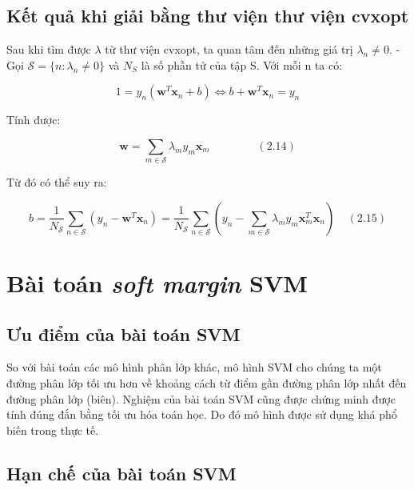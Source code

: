 \documentclass[a4paper, 12pt, oneside]{report}
\begin{document}
\subsection{Kết quả khi giải bằng thư viện thư viện cvxopt}
Sau khi tìm được $\lambda$ từ thư viện cvxopt, ta quan tâm đến những giá trị $\lambda_n \neq 0$. 
- Gọi $\mathcal{S} = \{n: \lambda_n \neq 0\}$ và $N_S$ là số phần tử của tập S. Với mỗi n ta có:
\begin{mybox}
$$1 = y_n(\mathbf{w}^T\mathbf{x}_n + b) \Leftrightarrow b + \mathbf{w}^T\mathbf{x}_n = y_n$$ \end{mybox}
Tính được: \begin{mybox} $$\mathbf{w} = \sum_{m \in \mathcal{S}} \lambda_m y_m \mathbf{x}_m ~~~~~~~~~~~~~~~~~~~ (2.14)$$ \end{mybox}
Từ đó có thể suy ra: 
\begin{mybox}
$$ b = \frac{1}{N_{\mathcal{S}}} \sum_{n \in \mathcal{S}}(y_n - \mathbf{w}^T\mathbf{x}_n) = \frac{1}{N_{\mathcal{S}}} \sum_{n \in \mathcal{S}} \left(y_n - \sum_{m\in \mathcal{S}} \lambda_m y_m \mathbf{x}_m^T \mathbf{x}_n\right)~~~~~ (2.15)$$ 
\end{mybox}
\section{Bài toán \textit{soft margin} SVM}
\subsection{Ưu điểm của bài toán SVM}
So với bài toán các mô hình phân lớp khác, mô hình SVM cho chúng ta một đường phân lớp tối ưu hơn về khoảng cách từ điểm gần đường phân lớp nhất đến đường phân lớp (biên). Nghiệm của bài toán SVM cũng được chứng minh được tính đúng đắn bằng tối ưu hóa toán học. Do đó mô hình được sử dụng khá phổ biến trong thực tế.\\
\subsection{Hạn chế của bài toán SVM}
\end{document}
